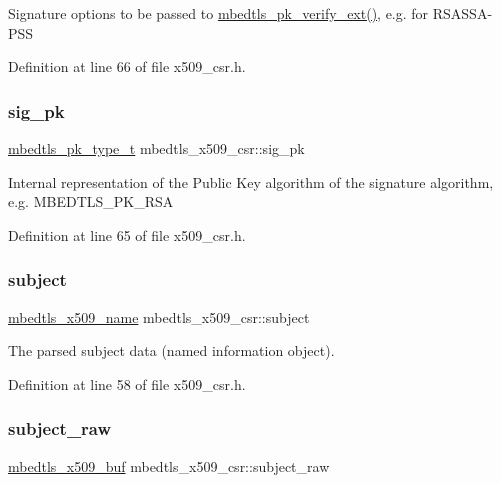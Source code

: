 Signature options to be passed to \mbox{\hyperlink{pk_8h_a81f0c5e40b839f5eca676c2c2752036f}{mbedtls\+\_\+pk\+\_\+verify\+\_\+ext()}}, e.\+g. for R\+S\+A\+S\+S\+A-\/\+P\+SS 

Definition at line 66 of file x509\+\_\+csr.\+h.

\mbox{\label{structmbedtls__x509__csr_a670fac5f5b5cd7398e1b241dc257bc97}} 
\subsubsection{\texorpdfstring{sig\+\_\+pk}{sig\_pk}}
{\footnotesize\ttfamily \mbox{\hyperlink{pk_8h_a3fe41eff5605ae727eb9d28dad297020}{mbedtls\+\_\+pk\+\_\+type\+\_\+t}} mbedtls\+\_\+x509\+\_\+csr\+::sig\+\_\+pk}

Internal representation of the Public Key algorithm of the signature algorithm, e.\+g. M\+B\+E\+D\+T\+L\+S\+\_\+\+P\+K\+\_\+\+R\+SA 

Definition at line 65 of file x509\+\_\+csr.\+h.

\mbox{\label{structmbedtls__x509__csr_a0c403df635495f8cba9b3e1001fc4491}} 
\subsubsection{\texorpdfstring{subject}{subject}}
{\footnotesize\ttfamily \mbox{\hyperlink{group__x509__module_ga2272228c7776102328df31623af3168c}{mbedtls\+\_\+x509\+\_\+name}} mbedtls\+\_\+x509\+\_\+csr\+::subject}

The parsed subject data (named information object). 

Definition at line 58 of file x509\+\_\+csr.\+h.

\mbox{\label{structmbedtls__x509__csr_ad85a7b3987a80254911b8d48a1beb78f}} 
\subsubsection{\texorpdfstring{subject\+\_\+raw}{subject\_raw}}
{\footnotesize\ttfamily \mbox{\hyperlink{group__x509__module_ga4d02c9e8e4e2934555e0d132cd2976dc}{mbedtls\+\_\+x509\+\_\+buf}} mbedtls\+\_\+x509\+\_\+csr\+::subject\+\_\+raw}

